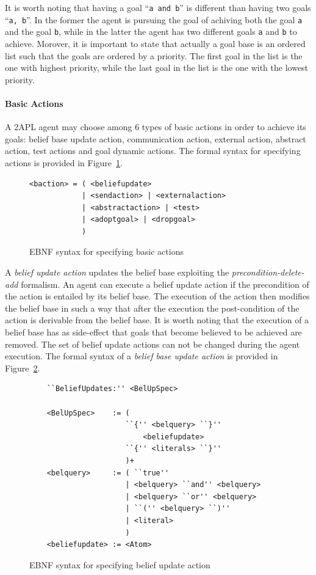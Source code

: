 \documentclass[a4paper]{article}
\begin{document}
It is worth noting that having a goal ``\texttt{a and b}'' is different than having two goals ``\texttt{a, b}''. In the former the agent is pursuing the goal of achiving both the goal \texttt{a} and the goal \texttt{b}, while in the latter the agent has two different goals \texttt{a} and \texttt{b} to achieve. Morover, it is important to state that actually a goal base is an ordered list such that the goals are ordered by a priority. The first goal in the list is the one with highest priority, while the last goal in the list is the one with the lowest priority.

\paragraph{Basic Actions}

A 2APL agent may choose among 6 types of basic actions in order to achieve its goals: belief base update action, communication action, external action, abstract action, test actions and goal dynamic actions. The formal syntax for specifying actions is provided in Figure~\ref{fig:ebnf_actions}.

\begin{figure}[htp]
\begin{verbatim}
<baction> = ( <beliefupdate>
            | <sendaction> | <externalaction> 
            | <abstractaction> | <test>
            | <adoptgoal> | <dropgoal>
            )
\end{verbatim}
\caption{EBNF syntax for specifying basic actions}
\label{fig:ebnf_actions}
\end{figure}

A \emph{belief update action} updates the belief base exploiting the \emph{precondition-delete-add} formalism. An agent can
execute a belief update action if the precondition of the action is entailed by its belief base. The execution of the action then modifies the belief base in such a way that after the execution the post-condition of the action is derivable from the belief base. It is worth noting that the execution of a belief base has as side-effect that goals that become believed to be achieved are removed. The set of belief update actions can not be changed during the agent execution. The formal syntax of a \emph{belief base update action} is provided in Figure~\ref{fig:ebnf_beliefupdate}.

\begin{figure}[htp]
\begin{verbatim}
	``BeliefUpdates:'' <BelUpSpec>
	
	<BelUpSpec>    := (
	                  ``{'' <belquery> ``}''
	                      <beliefupdate>
	                  ``{'' <literals> ``}''
	                  )+
	<belquery>     := ( ``true'' 
	                  | <belquery> ``and'' <belquery>
	                  | <belquery> ``or'' <belquery>
	                  | ``('' <belquery> ``)''
	                  | <literal>
	                  )
	<beliefupdate> := <Atom>
\end{verbatim}
\caption{EBNF syntax for specifying belief update action}
\label{fig:ebnf_beliefupdate}
\end{figure}
\end{document}

